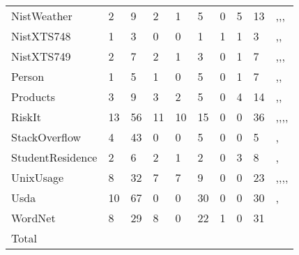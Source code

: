 \begin{table*}[t]
\begin{tabular}{llllllllll}
NistWeather  & 2 & 9      &    2         &         1    &     5     &    0    &   5    & 13 &  \cite{mcminn2016virtual},\cite{kapfhammer2013search},\cite{mcminn2015effectiveness},\cite{kinneer2015automatically}\\
NistXTS748 & 1 & 3        &     0        &       0      &    1      &    1    &    1   & 3 &  \cite{kapfhammer2013search},\cite{mcminn2015effectiveness},\cite{kinneer2015automatically} \\
NistXTS749 & 2 & 7        &     2        &       1      &    3      &    0    &    1   & 7 &  \cite{kapfhammer2013search},\cite{wright2014impact},\cite{mcminn2015effectiveness},\cite{kinneer2015automatically} \\
Person       & 1 & 5      &     1        &       0      &    5      &    0    &   1    & 7 &  \cite{mcminn2016virtual},\cite{kapfhammer2013search},\cite{mcminn2015effectiveness}\\
Products     & 3 & 9      &        3     &      2       &    5      &   0     &  4     & 14 &   \cite{mcminn2016virtual},\cite{kapfhammer2013search},\cite{mcminn2015effectiveness}\\
RiskIt & 13  & 56         &     11       &    10        &    15     &    0    &   0    & 36 &  \cite{kapfhammer2013search},\cite{wright2013efficient},\cite{wright2014impact},\cite{mcminn2015effectiveness},\cite{kinneer2015automatically} \\
StackOverflow &  4  & 43  &      0       &        0     &     5     &    0    &  0     & 5 & \cite{wright2014impact},\cite{mcminn2015effectiveness} \\
StudentResidence & 2 & 6  &     2        &     1        &    2      &   0     &    3   & 8 &  \cite{kapfhammer2013search},\cite{mcminn2015effectiveness} \\
UnixUsage & 8  & 32       &     7        &     7        &    9      &   0     &   0    & 23 &  \cite{kapfhammer2013search},\cite{wright2013efficient},\cite{wright2014impact},\cite{mcminn2015effectiveness},\cite{kinneer2015automatically} \\
Usda & 10   & 67          &       0      &        0     &  30       &    0    &   0    & 30 & \cite{kapfhammer2013search},\cite{mcminn2015effectiveness}  \\
WordNet & 8 & 29          &        8     &       0      &  22       &    1    &   0    & 31 & \cite{wright2014impact} \\
Total   &        &         &              &              &           &         &        &  & 
\end{tabular}
\end{table*}
